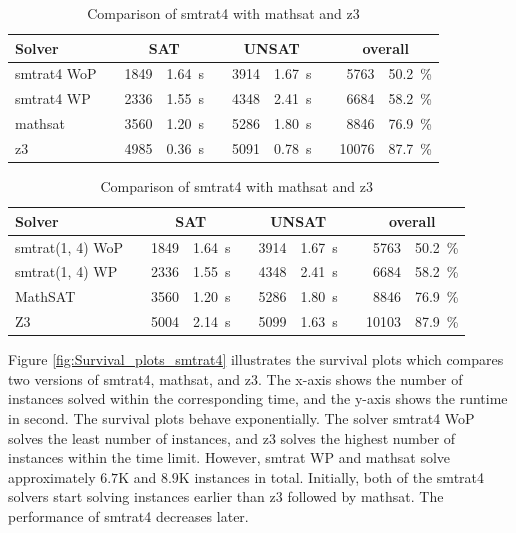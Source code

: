 \begin{table}[!ht]
    \caption{Comparison of smtrat4 with mathsat and z3}    
    \begin{tabularx}{\textwidth}{lXrrXrrXrr}
	\toprule
	\textbf{Solver}
	&& \multicolumn{2}{c}{\textbf{SAT}}
	&& \multicolumn{2}{c}{\textbf{UNSAT}}
	&& \multicolumn{2}{c}{\textbf{overall}}
	\\
	\midrule
	smtrat4 WoP
	&& 1849 & 1.64~s
	&& 3914 & 1.67~s
	&& 5763 & 50.2~\%
	\\
	smtrat4 WP
	&& 2336 & 1.55~s
	&& 4348 & 2.41~s
	&& 6684 & 58.2~\%
	\\
	mathsat
    	&& 3560 & 1.20~s
     	&& 5286 & 1.80~s
     	&& 8846 & 76.9~\%
	\\
	z3
	&& 4985 & 0.36~s
	&& 5091 & 0.78~s
	&& 10076 & 87.7~\%
	\\
	\bottomrule
\end{tabularx}
    \label{table:smtrat4_vs_mathsatAndZ3}
\end{table}

\begin{table}[!ht]
    \caption{Comparison of smtrat4 with mathsat and z3}    
    \begin{tabularx}{\textwidth}{lXrrXrrXrr}
	\toprule
	\textbf{Solver}
	&& \multicolumn{2}{c}{\textbf{SAT}}
	&& \multicolumn{2}{c}{\textbf{UNSAT}}
	&& \multicolumn{2}{c}{\textbf{overall}}
	\\
	\midrule
	smtrat(1, 4) WoP
	&& 1849 & 1.64~s
	&& 3914 & 1.67~s
	&& 5763 & 50.2~\%
	\\
	smtrat(1, 4) WP
	&& 2336 & 1.55~s
	&& 4348 & 2.41~s
	&& 6684 & 58.2~\%
	\\
	MathSAT
    	&& 3560 & 1.20~s
     	&& 5286 & 1.80~s
     	&& 8846 & 76.9~\%
	\\
	Z3
	&& 5004 & 2.14~s
	&& 5099 & 1.63~s
	&& 10103 & 87.9~\%
	\\
	\bottomrule
\end{tabularx}
\end{table}

\noindent Figure \ref{fig:Survival_plots_smtrat4} illustrates the survival plots which compares two versions of smtrat4, mathsat, and z3.
The x-axis shows the number of instances solved within the corresponding time, and the y-axis shows the runtime in second.
The survival plots behave exponentially.
The solver smtrat4 WoP solves the least number of instances, and z3 solves the highest number of instances within the time limit.
However, smtrat WP and mathsat solve approximately $6.7$K and $8.9$K instances in total.
Initially, both of the smtrat4 solvers start solving instances earlier than z3 followed by mathsat.
The performance of smtrat4 decreases later.\newline

